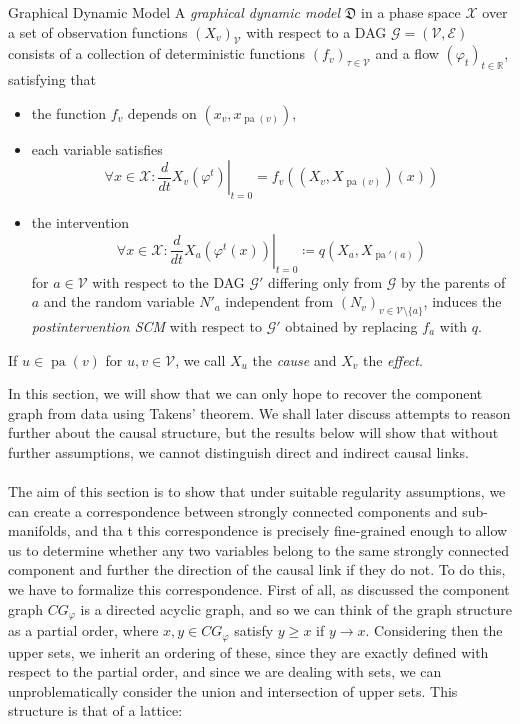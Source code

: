 \documentclass[11pt, a4paper]{memoir}
\theoremstyle{break}
\theoremstyle{break}
\theoremstyle{nonumberplain}
\newcommand{\mR}{\mathbb{R}}
\DeclareMathOperator{\pa}{pa}
\begin{document}
\begin{mydefinition}{Graphical Dynamic Model}
A \emph{graphical dynamic model} $\mathfrak{D}$ in a phase space $\mathcal{X}$ over a set of observation functions $(X_v)_\mathcal{V}$ with respect to a DAG $\mathcal{G}=(\mathcal{V},\mathcal{E})$ consists of a collection of deterministic functions $(f_v)_{\tau\in \mathcal{V}}$ and a flow $(\varphi_t)_{t\in \mR}$, satisfying that
\begin{itemize}
	\item the function $f_v$ depends on $\left(x_v,x_{\pa(v)} \right)$,
	\item each variable satisfies
	$$\forall x\in \mathcal{X}:\left. \frac{d}{dt}X_v\left(\varphi^t\right)\right|_{t=0}=f_v\left(\left(X_v,X_{\pa(v)}\right)(x)\right)$$
	\item the intervention 
	$$\forall x\in \mathcal{X}: \left.\frac{d}{dt} X_a(\varphi^t(x))\right|_{t=0}\coloneqq q\left(X_a,X_{\pa'(a)}\right)$$ 
	for $a\in \mathcal{V}$ with respect to the DAG $\mathcal{G}'$ differing only from $\mathcal{G}$ by the parents of $a$ and the random variable $N'_a$ independent from $(N_v)_{v\in \mathcal{V}\setminus \{a\}}$, induces the \emph{postintervention SCM} with respect to $\mathcal{G}'$ obtained by replacing $f_a$ with $q$.
\end{itemize}
If $u\in \pa(v)$ for $u,v\in \mathcal{V}$, we call $X_u$ the \emph{cause} and $X_v$ the \emph{effect}. 
\end{mydefinition}

In this section, we will show that we can only hope to recover the component graph from data using Takens' theorem. We shall later discuss attempts to reason further about the causal structure, but the results below will show that without further assumptions, we cannot distinguish direct and indirect causal links.\\\\
The aim of this section is to show that under suitable regularity assumptions, we can create a correspondence between strongly connected components and sub-manifolds, and tha	t this correspondence is precisely fine-grained enough to allow us to determine whether any two variables belong to the same strongly connected component and further the direction of the causal link if they do not. To do this, we have to formalize this correspondence. First of all, as discussed the component graph $CG_\varphi$ is a directed acyclic graph, and so we can think of the graph structure as a partial order, where $x,y\in CG_\varphi$ satisfy $y\geqslant x$ if $y\to x$. Considering then the upper sets, we inherit an ordering of these, since they are exactly defined with respect to the partial order, and since we are dealing with sets, we can unproblematically consider the union and intersection of upper sets. This structure is that of a lattice:
\end{document}
